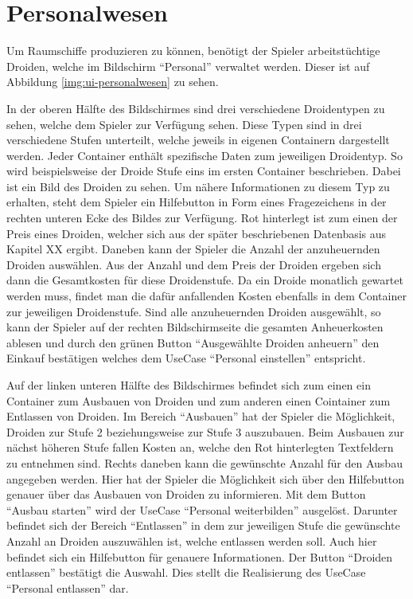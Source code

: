 \section{Personalwesen}
\label{sec:ui-personalwesen}

Um Raumschiffe produzieren zu können, benötigt der Spieler arbeitstüchtige Droiden, welche im Bildschirm “Personal” verwaltet werden. Dieser ist auf Abbildung \vref{img:ui-personalwesen} zu sehen.

In der oberen Hälfte des Bildschirmes sind drei verschiedene Droidentypen zu sehen, welche dem Spieler zur Verfügung sehen. Diese Typen sind in drei verschiedene Stufen unterteilt, welche jeweils in eigenen Containern dargestellt werden. Jeder Container enthält spezifische Daten zum jeweiligen Droidentyp. So wird beispielsweise der Droide Stufe eins im ersten Container beschrieben. Dabei ist ein Bild des Droiden zu sehen. Um nähere Informationen zu diesem Typ zu erhalten, steht dem Spieler ein Hilfebutton in Form eines Fragezeichens in der rechten unteren Ecke des Bildes zur Verfügung. Rot hinterlegt ist zum einen der Preis eines Droiden, welcher sich aus der später beschriebenen Datenbasis aus Kapitel XX ergibt. Daneben kann der Spieler die Anzahl der anzuheuernden Droiden auswählen. Aus der Anzahl und dem Preis der Droiden ergeben sich dann die Gesamtkosten für diese Droidenstufe. Da ein Droide monatlich gewartet werden muss, findet man die dafür anfallenden Kosten ebenfalls in dem Container zur jeweiligen Droidenstufe. Sind alle anzuheuernden Droiden ausgewählt, so kann der Spieler auf der rechten Bildschirmseite die gesamten Anheuerkosten ablesen und durch den grünen Button “Ausgewählte Droiden anheuern” den Einkauf bestätigen welches dem UseCase “Personal einstellen” entspricht.

Auf der linken unteren Hälfte des Bildschirmes befindet sich zum einen ein Container zum Ausbauen von Droiden und zum anderen einen Cointainer zum Entlassen von Droiden. Im Bereich “Ausbauen” hat der Spieler die Möglichkeit, Droiden zur Stufe 2 beziehungsweise zur Stufe 3 auszubauen. Beim Ausbauen zur nächst höheren Stufe fallen Kosten an, welche den Rot hinterlegten Textfeldern zu entnehmen sind. Rechts daneben kann die gewünschte Anzahl für den Ausbau angegeben werden. Hier hat der Spieler die Möglichkeit sich über den Hilfebutton genauer über das Ausbauen von Droiden zu informieren. Mit dem Button “Ausbau starten” wird der UseCase “Personal weiterbilden” ausgelöst. Darunter befindet sich der Bereich “Entlassen” in dem zur jeweiligen Stufe die gewünschte Anzahl an Droiden auszuwählen ist, welche entlassen werden soll. Auch hier befindet sich ein Hilfebutton für genauere Informationen. Der Button “Droiden entlassen” bestätigt die Auswahl. Dies stellt die Realisierung des UseCase “Personal entlassen” dar. 

